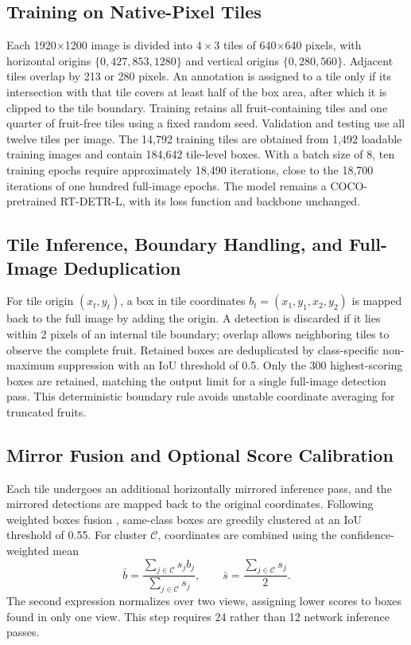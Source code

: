 \documentclass[11pt,a4paper]{article}
\begin{document}
\subsection{Training on Native-Pixel Tiles}

Each 1920$\times$1200 image is divided into $4\times3$ tiles of 640$\times$640 pixels, with horizontal origins $\{0,\allowbreak 427,\allowbreak 853,\allowbreak 1280\}$ and vertical origins $\{0,\allowbreak 280,\allowbreak 560\}$. Adjacent tiles overlap by 213 or 280 pixels. An annotation is assigned to a tile only if its intersection with that tile covers at least half of the box area, after which it is clipped to the tile boundary. Training retains all fruit-containing tiles and one quarter of fruit-free tiles using a fixed random seed. Validation and testing use all twelve tiles per image. The 14,792 training tiles are obtained from 1,492 loadable training images and contain 184,642 tile-level boxes. With a batch size of 8, ten training epochs require approximately 18,490 iterations, close to the 18,700 iterations of one hundred full-image epochs. The model remains a COCO-pretrained RT-DETR-L, with its loss function and backbone unchanged.

\subsection{Tile Inference, Boundary Handling, and Full-Image Deduplication}
For tile origin $(x_t,y_t)$, a box in tile coordinates $b_t=(x_1,y_1,x_2,y_2)$ is mapped back to the full image by adding the origin. A detection is discarded if it lies within 2 pixels of an internal tile boundary; overlap allows neighboring tiles to observe the complete fruit. Retained boxes are deduplicated by class-specific non-maximum suppression with an IoU threshold of 0.5. Only the 300 highest-scoring boxes are retained, matching the output limit for a single full-image detection pass. This deterministic boundary rule avoids unstable coordinate averaging for truncated fruits.

\subsection{Mirror Fusion and Optional Score Calibration}
Each tile undergoes an additional horizontally mirrored inference pass, and the mirrored detections are mapped back to the original coordinates. Following weighted boxes fusion \cite{wbf}, same-class boxes are greedily clustered at an IoU threshold of 0.55. For cluster $\mathcal{C}$, coordinates are combined using the confidence-weighted mean
\begin{equation}
\bar b=\frac{\sum_{j\in\mathcal{C}}s_j b_j}{\sum_{j\in\mathcal{C}}s_j},
\qquad
\bar s=\frac{\sum_{j\in\mathcal{C}}s_j}{2}.
\end{equation}
The second expression normalizes over two views, assigning lower scores to boxes found in only one view. This step requires 24 rather than 12 network inference passes.
\end{document}
